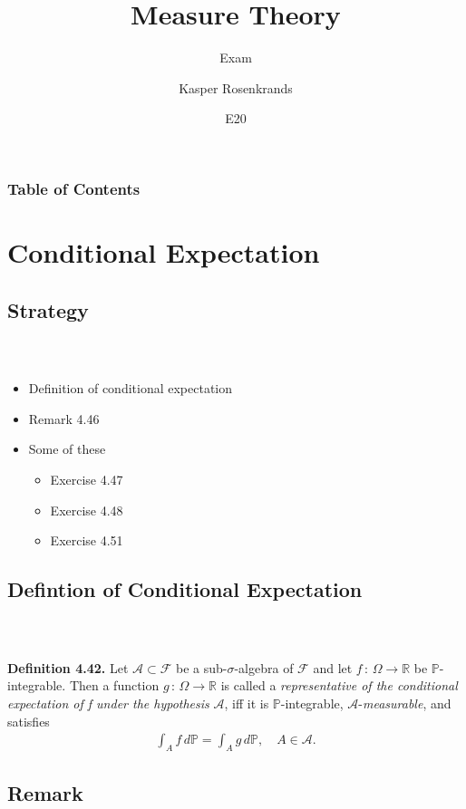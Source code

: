 \documentclass{beamer}
\title{Measure Theory}
\subtitle{Exam}
\author{Kasper Rosenkrands}
\institute{Aalborg University}
\date{E20}
\numberwithin{equation}{section}
\newenvironment{frame2}{\begin{frame}\frametitle{{\normalsize \secname} \\ {\large \subsecname}}}{\end{frame}}
\begin{document}
\frame{\titlepage}

\begin{frame}
\frametitle{Table of Contents}
\tableofcontents[hideallsubsections]
\end{frame}

\section{Conditional Expectation}

\subsection{Strategy}
\begin{frame2}
    \begin{itemize}
        \item Definition of conditional expectation
        \item Remark 4.46
        \item Some of these
        \begin{itemize}
            \item Exercise 4.47
            \item Exercise 4.48
            \item Exercise 4.51
        \end{itemize}
    \end{itemize}
\end{frame2}

\subsection{Defintion of Conditional Expectation}

\begin{frame2}
    \textbf{Definition 4.42.}
    Let $\mathcal{A} \subset \mathcal{F}$ be a sub-$\sigma$-algebra of $\mathcal{F}$ and let $f \, : \, \Omega \rightarrow \mathbb{R}$ be $\mathbb{P}$-integrable.
    Then a function $g \, : \, \Omega \rightarrow \mathbb{R}$ is called a \textit{representative of the conditional expectation of f under the hypothesis} $\mathcal{A}$, iff it is $\mathbb{P}$-integrable, $\mathcal{A}$-\textit{measurable}, and satisfies
    \begin{align}\label{eq:4.15}
        \int_Af\, d\mathbb{P} = \int_Ag\, d\mathbb{P}, \quad A \in \mathcal{A}.
    \end{align}
\end{frame2}

\subsection{Remark}
\end{document}

